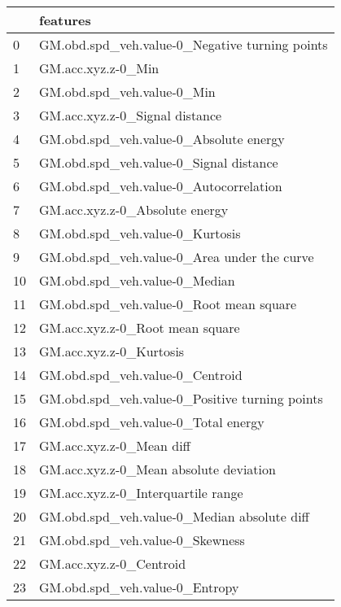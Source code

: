 \begin{tabular}{ll}
\toprule
{} &                                        features \\
\midrule
0  &  GM.obd.spd\_veh.value-0\_Negative turning points \\
1  &                              GM.acc.xyz.z-0\_Min \\
2  &                      GM.obd.spd\_veh.value-0\_Min \\
3  &                  GM.acc.xyz.z-0\_Signal distance \\
4  &          GM.obd.spd\_veh.value-0\_Absolute energy \\
5  &          GM.obd.spd\_veh.value-0\_Signal distance \\
6  &          GM.obd.spd\_veh.value-0\_Autocorrelation \\
7  &                  GM.acc.xyz.z-0\_Absolute energy \\
8  &                 GM.obd.spd\_veh.value-0\_Kurtosis \\
9  &     GM.obd.spd\_veh.value-0\_Area under the curve \\
10 &                   GM.obd.spd\_veh.value-0\_Median \\
11 &         GM.obd.spd\_veh.value-0\_Root mean square \\
12 &                 GM.acc.xyz.z-0\_Root mean square \\
13 &                         GM.acc.xyz.z-0\_Kurtosis \\
14 &                 GM.obd.spd\_veh.value-0\_Centroid \\
15 &  GM.obd.spd\_veh.value-0\_Positive turning points \\
16 &             GM.obd.spd\_veh.value-0\_Total energy \\
17 &                        GM.acc.xyz.z-0\_Mean diff \\
18 &          GM.acc.xyz.z-0\_Mean absolute deviation \\
19 &              GM.acc.xyz.z-0\_Interquartile range \\
20 &     GM.obd.spd\_veh.value-0\_Median absolute diff \\
21 &                 GM.obd.spd\_veh.value-0\_Skewness \\
22 &                         GM.acc.xyz.z-0\_Centroid \\
23 &                  GM.obd.spd\_veh.value-0\_Entropy \\
\bottomrule
\end{tabular}
